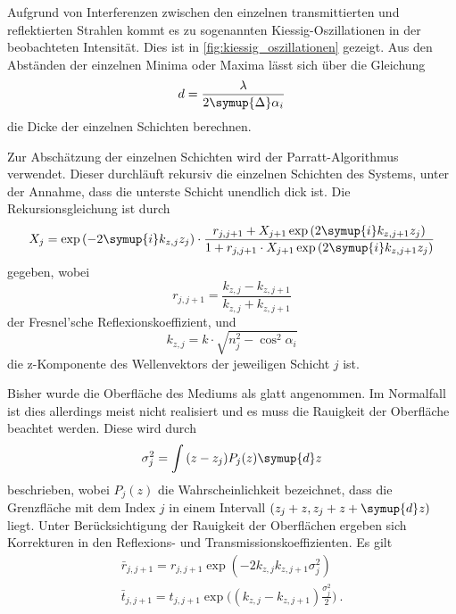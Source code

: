 Aufgrund von Interferenzen zwischen den einzelnen transmittierten und reflektierten Strahlen kommt es zu sogenannten Kiessig-Oszillationen \cite{kiessig} in der beobachteten Intensität.
Dies ist in \autoref{fig:kiessig_oszillationen} gezeigt.
Aus den Abständen der einzelnen Minima oder Maxima lässt sich über die Gleichung
\begin{equation}
    d = \frac{\lambda}{2 \symup{\Delta} \alpha_i}
    \label{eqn:schichtdicke_kiessig}
\end{equation}
die Dicke der einzelnen Schichten berechnen.

Zur Abschätzung der einzelnen Schichten wird der Parratt-Algorithmus \cite{parratt} verwendet.
Dieser durchläuft rekursiv die einzelnen Schichten des Systems,
unter der Annahme,
dass die unterste Schicht unendlich dick ist.
Die Rekursionsgleichung ist durch
\begin{equation}
    X_{j} = \exp{(-2\symup{i} k_{z, j} z_{j})} \cdot
    \frac{r_{j, j+1} + X_{j+1} \exp{(2\symup{i} k_{z, j+1} z_{j})}}
    {1 + r_{j, j+1} \cdot X_{j+1} \exp{(2\symup{i} k_{z, j+1} z_{j})}}
\end{equation}
gegeben,
wobei
\begin{equation}
    r_{j, j+1} = \frac{k_{z, j} - k_{z, j+1}}{k_{z, j} + k_{z, j+1}}
\end{equation}
der Fresnel'sche Reflexionskoeffizient,
und
\begin{equation}
    k_{z, j} = k \cdot \sqrt{n^2_j - \cos^2{\alpha_i}}
\end{equation}
die z-Komponente des Wellenvektors der jeweiligen Schicht $j$ ist.

Bisher wurde die Oberfläche des Mediums als glatt angenommen.
Im Normalfall ist dies allerdings meist nicht realisiert und es muss die Rauigkeit der Oberfläche beachtet werden.
Diese wird durch
\begin{equation}
    \sigma^2_j = \int{(z-z_j) P_j(z) \symup{d}z}
\end{equation}
beschrieben,
wobei $P_j(z)$ die Wahrscheinlichkeit bezeichnet,
dass die Grenzfläche mit dem Index $j$ in einem Intervall $(z_j + z, z_j + z + \symup{d}z)$ liegt.
Unter Berücksichtigung der Rauigkeit der Oberflächen ergeben sich Korrekturen in den Reflexions- und Transmissionskoeffizienten.
Es gilt
\begin{gather}
    \bar{r}_{j, j+1} = r_{j, j+1} \exp{(-2 k_{z, j} k_{z, j+1} \sigma^2_{j})} \\
    \bar{t}_{j, j+1} = t_{j, j+1} \exp{\biggl((k_{z, j} - k_{z, j+1}) \frac{\sigma^2_{j}}{2}\biggr)} \ .
\end{gather}
